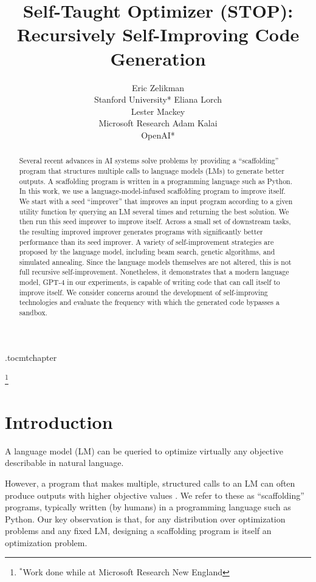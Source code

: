 \documentclass{article}
\title{\textbf{S}elf-\textbf{T}aught \textbf{Op}timizer (\textbf{STOP}): Recursively Self-Improving Code Generation}
\author{Eric Zelikman \\
Stanford University*
\And
Eliana Lorch\\
\And
Lester Mackey\\
Microsoft Research
\And
Adam Kalai\\
OpenAI*
}
\newcommand\blfootnote[1]{
  \begingroup
  \renewcommand\thefootnote{}\footnote{#1}
  \addtocounter{footnote}{-1}
  \endgroup
}
\begin{document}
\maketitle

\etocdepthtag.toc{mtchapter}


\begin{abstract}
Several recent advances in AI systems 
solve problems by providing a ``scaffolding'' program that structures multiple calls to language models (LMs) to generate better outputs. A scaffolding program is written in a programming language such as Python. In this work, we use a language-model-infused scaffolding program to improve itself. We start with a seed ``improver'' that improves an input program according to a given utility function by querying an LM several times and returning the best solution. 
We then run this seed improver to improve itself. 
Across a small set of downstream tasks, the resulting improved improver generates programs with significantly better performance than its seed improver. 
A variety of self-improvement strategies are proposed by the language model, including beam search, genetic algorithms, and simulated annealing.
Since the language models themselves are not altered, this is not full recursive self-improvement. Nonetheless, it demonstrates that a modern language model, GPT-4 in our experiments, is capable of writing code that can call itself to improve itself. We consider concerns around the development of self-improving technologies and evaluate the frequency with which the generated code bypasses a sandbox.
\end{abstract}








\blfootnote{$^*$Work done while at Microsoft Research New England}

\vspace{-3px}
\section{Introduction}
\vspace{-3px}
A language model (LM) can be queried to optimize virtually any objective describable in natural language. 


However,
a program that makes multiple, structured calls to an LM can often produce outputs with higher objective values \citep{yao2022react,yao2023tree,zelikman2022parsel,chen2022program}. We refer to these as ``scaffolding'' programs, typically written (by humans) in a programming language such as Python.
Our key observation is that, for any distribution over optimization problems and any fixed LM, designing a scaffolding program is itself an optimization problem.
\end{document}
